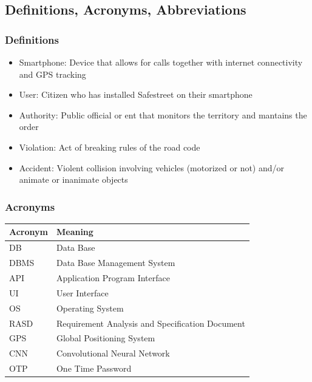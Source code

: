 \subsection{Definitions, Acronyms, Abbreviations}

\subsubsection{Definitions}

\begin{itemize}

\item Smartphone: Device that allows for calls together with internet connectivity and GPS tracking

\item User: Citizen who has installed Safestreet on their smartphone

\item Authority: Public official or ent that monitors the territory and mantains the order

\item Violation: Act of breaking rules of the road code

\item Accident: Violent collision involving vehicles (motorized or not) and/or animate or inanimate objects
 
\end{itemize}

\subsubsection{Acronyms}
\begin{tabular}{|l|l|}
\hline
Acronym & Meaning \\ \hline
DB & Data Base \\ \hline
DBMS & Data Base Management System \\ \hline
API & Application Program Interface \\ \hline
UI & User Interface \\ \hline
OS & Operating System \\ \hline
RASD & Requirement Analysis and Specification Document \\ \hline
GPS & Global Positioning System \\ \hline
CNN & Convolutional Neural Network \\ \hline
OTP & One Time Password \\ 
\hline
\end{tabular}

